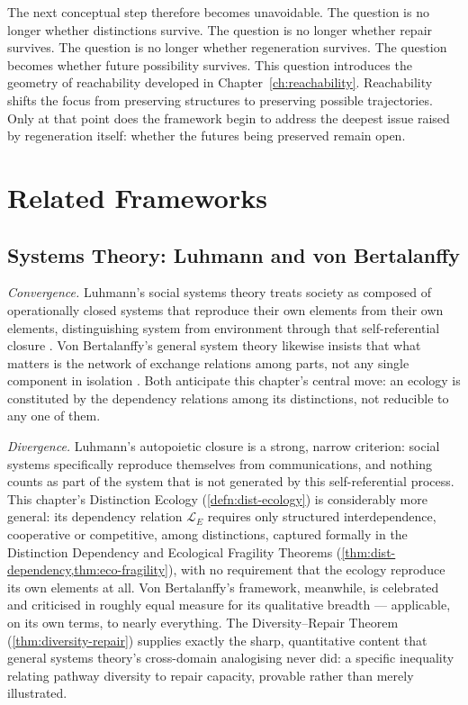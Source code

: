 \documentclass[12pt,twoside,openright]{book}
\begin{document}
The next conceptual step therefore becomes unavoidable. The
question is no longer whether distinctions survive. The
question is no longer whether repair survives. The question
is no longer whether regeneration survives. The question
becomes whether future possibility survives. This question
introduces the geometry of reachability developed in
Chapter~\ref{ch:reachability}. Reachability shifts the
focus from preserving structures to preserving possible
trajectories. Only at that point does the framework begin
to address the deepest issue raised by regeneration itself:
whether the futures being preserved remain open.

\section{Related Frameworks}
\label{sec:ch12-related-frameworks}

\subsection*{Systems Theory: Luhmann and von Bertalanffy}

\emph{Convergence.} Luhmann's social systems theory treats
society as composed of operationally closed systems that
reproduce their own elements from their own elements,
distinguishing system from environment through that
self-referential closure \parencite{luhmann1984,luhmann1990}.
Von Bertalanffy's general system theory likewise insists that
what matters is the network of exchange relations among parts,
not any single component in isolation \parencite{bertalanffy1968}.
Both anticipate this chapter's central move: an ecology is
constituted by the dependency relations among its distinctions,
not reducible to any one of them.

\emph{Divergence.} Luhmann's autopoietic closure is a strong,
narrow criterion: social systems specifically reproduce
themselves from communications, and nothing counts as part of
the system that is not generated by this self-referential
process. This chapter's Distinction Ecology
(\cref{defn:dist-ecology}) is considerably more general: its
dependency relation $\mathcal{L}_E$ requires only structured
interdependence, cooperative or competitive, among
distinctions, captured formally in the Distinction Dependency
and Ecological Fragility Theorems
(\cref{thm:dist-dependency,thm:eco-fragility}), with no
requirement that the ecology reproduce its own elements at all.
Von Bertalanffy's framework, meanwhile, is celebrated and
criticised in roughly equal measure for its qualitative
breadth --- applicable, on its own terms, to nearly everything.
The Diversity--Repair Theorem (\cref{thm:diversity-repair})
supplies exactly the sharp, quantitative content that general
systems theory's cross-domain analogising never did: a specific
inequality relating pathway diversity to repair capacity,
provable rather than merely illustrated.
\end{document}
